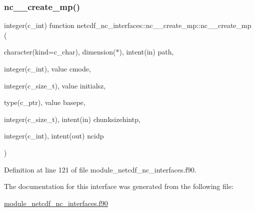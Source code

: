 \subsubsection{\texorpdfstring{nc\+\_\+\+\_\+create\+\_\+mp()}{nc\_\_create\_mp()}}
{\footnotesize\ttfamily integer(c\+\_\+int) function netcdf\+\_\+nc\+\_\+interfaces\+::nc\+\_\+\+\_\+create\+\_\+mp\+::nc\+\_\+\+\_\+create\+\_\+mp (\begin{DoxyParamCaption}\item[{character(kind=c\+\_\+char), dimension($\ast$), intent(in)}]{path,  }\item[{integer(c\+\_\+int), value}]{cmode,  }\item[{integer(c\+\_\+size\+\_\+t), value}]{initialsz,  }\item[{type(c\+\_\+ptr), value}]{basepe,  }\item[{integer(c\+\_\+size\+\_\+t), intent(in)}]{chunksizehintp,  }\item[{integer(c\+\_\+int), intent(out)}]{ncidp }\end{DoxyParamCaption})}



Definition at line 121 of file module\+\_\+netcdf\+\_\+nc\+\_\+interfaces.\+f90.



The documentation for this interface was generated from the following file\+:\begin{DoxyCompactItemize}
\item 
\hyperlink{module__netcdf__nc__interfaces_8f90}{module\+\_\+netcdf\+\_\+nc\+\_\+interfaces.\+f90}\end{DoxyCompactItemize}

